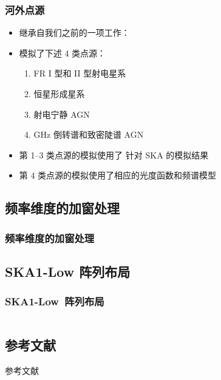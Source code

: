\documentclass{beamer}
\begin{document}
\begin{frame}[subsec]
  \frametitle{河外点源}
  \begin{itemize}
    \item 继承自我们之前的一项工作：\cite{wang2010}
    \item 模拟了下述 4 类点源：
      \begin{enumerate}
        \item FR I 型和 II 型射电星系
        \item 恒星形成星系
        \item 射电宁静 AGN
        \item GHz 倒转谱和致密陡谱 AGN
      \end{enumerate}
    \item 第 1--3 类点源的模拟使用了 \cite{wilman2008} 针对 SKA 的模拟结果
    \item 第 4 类点源的模拟使用了相应的光度函数和频谱模型
  \end{itemize}
\end{frame}

\subsection{频率维度的加窗处理}

\begin{frame}[subsec]
  \frametitle{频率维度的加窗处理}
\end{frame}

\subsection{SKA1-Low 阵列布局}

\begin{frame}[subsec]
  \frametitle{SKA1-Low~阵列布局}
  \begin{columns}

  \end{columns}
\end{frame}

\subsection{参考文献}

\begin{frame}[allowframebreaks]{参考文献}
  \printbibliography[heading=none]
\end{frame}
\end{document}
